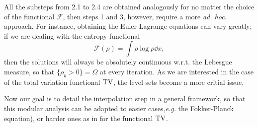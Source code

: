 All the substeps from 2.1 to 2.4 are obtained analogously for no matter the choice of the functional $\mathcal{F}$, then steps 1 and 3, however, require a more {\em ad. hoc.} approach. For instance, obtaining the Euler-Lagrange equations can vary greatly; if we are dealing with the entropy functional 
$$
\mathcal{F}(\rho) = \int\rho \log \rho \dd x, 
$$
then the solutions will always be absolutely continuous w.r.t. the Lebesgue measure, so that $\{\rho_k > 0\} = \Omega$ at every iteration. As we are interested in the case of the total variation functional $\text{TV}$, the level sets become a more critial issue. 

 	Now our goal is to detail the interpolation step in a general framework, so that this modular analysis can be adapted to easier cases,{\em e.g.} the Fokker-Planck equation), or harder ones as in for the functional $\text{TV}$. 